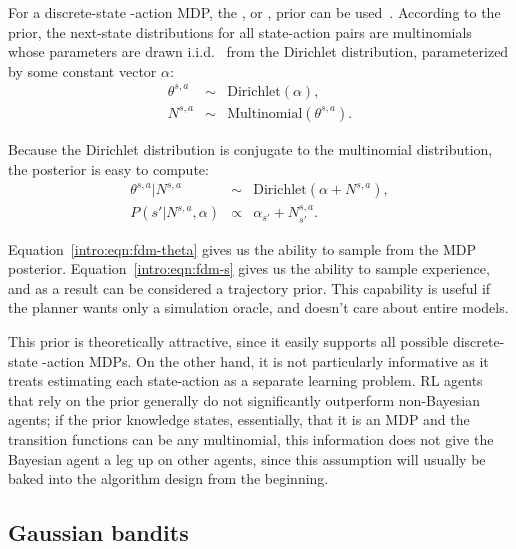 For a discrete-state -action MDP, the , or , prior can be used~\cite{poupart06}. According to the  prior, the next-state distributions for all state-action pairs are multinomials whose parameters are drawn i.i.d. \ from the Dirichlet distribution, parameterized by some constant vector $\alpha$:
\begin{eqnarray}
\theta^{s,a} &\sim& \mbox{Dirichlet}(\alpha),\\
N^{s,a} &\sim& \mbox{Multinomial}(\theta^{s,a}).
\end{eqnarray}

Because the Dirichlet distribution is conjugate to the multinomial distribution, the  posterior is easy to compute:
\begin{eqnarray}
\label{intro:eqn:fdm-theta}\theta^{s,a}|N^{s,a} &\sim& \mbox{Dirichlet}(\alpha+N^{s,a}),\\
\label{intro:eqn:fdm-s}P(s'|N^{s,a},\alpha) &\propto& \alpha_{s'}+N^{s,a}_{s'}.
\end{eqnarray}


Equation~\ref{intro:eqn:fdm-theta} gives us the ability to sample from the MDP posterior. Equation~\ref{intro:eqn:fdm-s} gives us the ability to sample experience, and as a result  can be considered a trajectory prior. This capability is useful if the planner wants only a simulation oracle, and doesn't care about entire models.

This prior is theoretically attractive, since it easily supports all possible discrete-state -action MDPs. On the other hand, it is not particularly informative as it treats estimating each state-action as a separate learning problem.  RL agents that rely on the  prior generally do not significantly outperform non-Bayesian agents\note{[ref?]}; if the prior knowledge states, essentially, that it is an MDP and the transition functions can be any multinomial, this information does not give the Bayesian agent a leg up on other agents, since this assumption will usually be baked into the algorithm design from the beginning. 

\subsection{Gaussian bandits}

